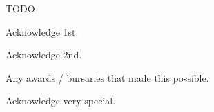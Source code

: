 TODO

Acknowledge 1st.

Acknowledge 2nd.

Any awards / bursaries that made this possible.

Acknowledge very special.

